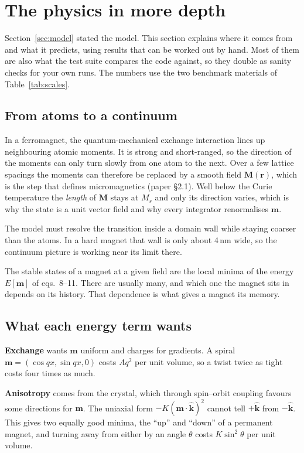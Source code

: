 \documentclass[10pt,a4paper]{article}
\newcommand{\vm}{\mathbf{m}}
\newcommand{\kh}{\hat{\mathbf{k}}}
\begin{document}
\section{The physics in more depth}
\label{sec:physics}

Section~\ref{sec:model} stated the model. This section explains where it comes from and what it predicts, using results
that can be worked out by hand. Most of them are also what the test suite compares the code against, so they double as
sanity checks for your own runs. The numbers use the two benchmark materials of Table~\ref{tab:scales}.

\subsection{From atoms to a continuum}
In a ferromagnet, the quantum-mechanical exchange interaction lines up neighbouring atomic moments. It is strong and
short-ranged, so the direction of the moments can only turn slowly from one atom to the next. Over a few lattice spacings
the moments can therefore be replaced by a smooth field $\mathbf{M}(\mathbf{r})$, which is the step that defines
micromagnetics (paper \S2.1). Well below the Curie temperature the \emph{length} of $\mathbf{M}$ stays at $M_s$ and only
its direction varies, which is why the state is a unit vector field and why every integrator renormalises $\vm$.

The model must resolve the transition inside a domain wall while staying coarser than the atoms. In a hard magnet that
wall is only about 4\,nm wide, so the continuum picture is working near its limit there.

The stable states of a magnet at a given field are the local minima of the energy $E[\vm]$ of eqs.~8--11. There are usually
many, and which one the magnet sits in depends on its history. That dependence is what gives a magnet its memory.

\subsection{What each energy term wants}
\textbf{Exchange} wants $\vm$ uniform and charges for gradients. A spiral $\vm = (\cos qx, \sin qx, 0)$ costs $Aq^2$ per
unit volume, so a twist twice as tight costs four times as much.

\textbf{Anisotropy} comes from the crystal, which through spin--orbit coupling favours some directions for $\vm$. The
uniaxial form $-K(\vm\cdot\kh)^2$ cannot tell $+\kh$ from $-\kh$. This gives two equally good minima, the ``up'' and
``down'' of a permanent magnet, and turning away from either by an angle $\theta$ costs $K\sin^2\theta$ per unit volume.
\end{document}
